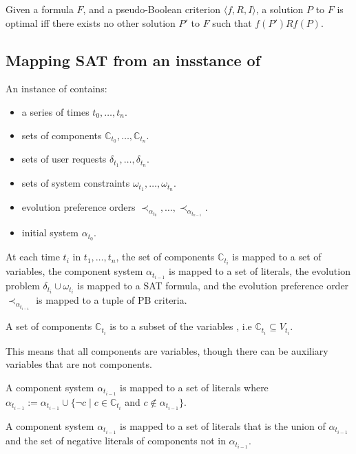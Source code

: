 \begin{defs}
Given a formula $F$, and a pseudo-Boolean criterion $\langle f, R , I \rangle$, 
a solution $P$ to $F$ is optimal iff there exists no other solution $P'$ to $F$ such that $f(P') R f(P)$. 
\end{defs}


\subsection{Mapping SAT from an insstance of \modelname}
An instance of \modelname contains:
\begin{itemize}
  \item a series of times $t_0,\ldots,t_n$.
  \item sets of components $\mathbb{C}_{t_0},\ldots,\mathbb{C}_{t_n}$.
  \item sets of user requests $\delta_{t_1},\ldots,\delta_{t_n}$.
  \item sets of system constraints $\omega_{t_1},\ldots,\omega_{t_n}$.
  \item evolution preference orders $\prec_{\alpha_{t_0}},\ldots, \prec_{\alpha_{t_{n-1}}}$.
  \item initial system $\alpha_{t_0}$.
\end{itemize}
At each time $t_i$ in $t_1,\ldots,t_n$, the set of components $\mathbb{C}_{t_i}$ is mapped to a set of variables,
the component system  $\alpha_{t_{i-1}}$ is mapped to a set of literals,
the evolution problem $\delta_{t_i} \cup \omega_{t_i}$ is mapped to a SAT formula,
and the evolution preference order $\prec_{\alpha_{t_{i-1}}}$ is mapped to a tuple of PB criteria.


\begin{defs}
A set of components $\mathbb{C}_{t_i}$ is to a subset of the variables , i.e $\mathbb{C}_{t_i} \subseteq V_{t_i}$.
\end{defs}
This means that all components are variables, though there can be auxiliary variables that are not components.

\begin{defs}
  \item A component system $\alpha_{t_{i-1}}$ is mapped to a set of literals where
   $\alpha_{t_{i-1}} := \alpha_{t_{i-1}} \cup \{\neg c \mid c \in \mathbb{C}_{t_i}$ and $ c \not \in \alpha_{t_{i-1}}\}$.
\end{defs}
A component system $\alpha_{t_{i-1}}$ is mapped to a set of literals that is the union of $\alpha_{t_{i-1}}$ and the set of negative literals of components not in $\alpha_{t_{i-1}}$.

